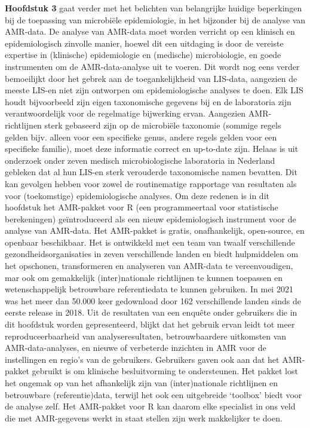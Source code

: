 \documentclass[
]{book}
\begin{document}
\textbf{Hoofdstuk 3} gaat verder met het belichten van belangrijke huidige beperkingen bij de toepassing van microbiële epidemiologie, in het bijzonder bij de analyse van AMR-data. De analyse van AMR-data moet worden verricht op een klinisch en epidemiologisch zinvolle manier, hoewel dit een uitdaging is door de vereiste expertise in (klinische) epidemiologie en (medische) microbiologie, en goede instrumenten om de AMR-data-analyse uit te voeren. Dit wordt nog eens verder bemoeilijkt door het gebrek aan de toegankelijkheid van LIS-data, aangezien de meeste LIS-en niet zijn ontworpen om epidemiologische analyses te doen. Elk LIS houdt bijvoorbeeld zijn eigen taxonomische gegevens bij en de laboratoria zijn verantwoordelijk voor de regelmatige bijwerking ervan. Aangezien AMR-richtlijnen sterk gebaseerd zijn op de microbiële taxonomie (sommige regels gelden bijv. alleen voor een specifieke genus, andere regels gelden voor een specifieke familie), moet deze informatie correct en up-to-date zijn. Helaas is uit onderzoek onder zeven medisch microbiologische laboratoria in Nederland gebleken dat al hun LIS-en sterk verouderde taxonomische namen bevatten. Dit kan gevolgen hebben voor zowel de routinematige rapportage van resultaten als voor (toekomstige) epidemiologische analyses. Om deze redenen is in dit hoofdstuk het AMR-pakket voor R (een programmeertaal voor statistische berekeningen) geïntroduceerd als een nieuw epidemiologisch instrument voor de analyse van AMR-data. Het AMR-pakket is gratis, onafhankelijk, open-source, en openbaar beschikbaar. Het is ontwikkeld met een team van twaalf verschillende gezondheidsorganisaties in zeven verschillende landen en biedt hulpmiddelen om het opschonen, transformeren en analyseren van AMR-data te vereenvoudigen, mar ook om gemakkelijk (inter)nationale richtlijnen te kunnen toepassen en wetenschappelijk betrouwbare referentiedata te kunnen gebruiken. In mei 2021 was het meer dan 50.000 keer gedownload door 162 verschillende landen sinds de eerste release in 2018. Uit de resultaten van een enquête onder gebruikers die in dit hoofdstuk worden gepresenteerd, blijkt dat het gebruik ervan leidt tot meer reproduceerbaarheid van analyseresultaten, betrouwbaardere uitkomsten van AMR-data-analyses, en nieuwe of verbeterde inzichten in AMR voor de instellingen en regio's van de gebruikers. Gebruikers gaven ook aan dat het AMR-pakket gebruikt is om klinische besluitvorming te ondersteunen. Het pakket lost het ongemak op van het afhankelijk zijn van (inter)nationale richtlijnen en betrouwbare (referentie)data, terwijl het ook een uitgebreide `toolbox' biedt voor de analyse zelf. Het AMR-pakket voor R kan daarom elke specialist in ons veld die met AMR-gegevens werkt in staat stellen zijn werk makkelijker te doen.
\end{document}
